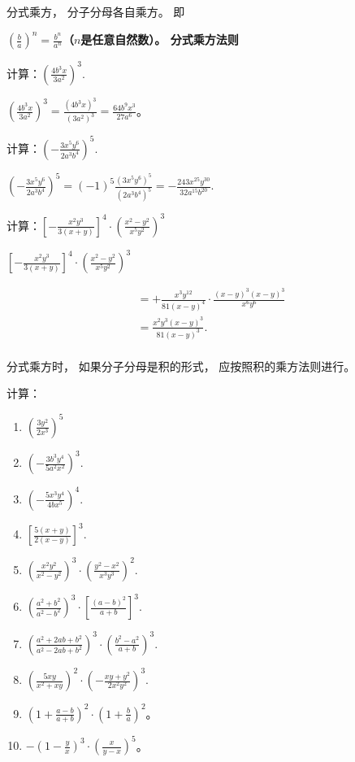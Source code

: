 分式乘方， 分子分母各自乘方。 即

\textbf{\(\left(\frac{b}{a}\right)^n = \frac{b^n}{a^n}\)（\(n\)是任意自然数）。
分式乘方法则}

 计算：\(\left(\frac{4b^3x}{3a^2}\right)^3.\)

\(\left(\frac{4b^3x}{3a^2}\right)^3 = \frac{(4b^3x)^3}{(3a^2)^3} = \frac{64b^9x^3}{27a^6}\)。

 计算：\(\left(-\frac{3x^5y^6}{2a^3b^4}\right)^5.\)

\(\left(-\frac{3x^5y^6}{2a^3b^4}\right)^5 = (-1)^5\frac{(3x^5y^6)^5}{(2a^3b^4)^5} = -\frac{243x^{25}y^{30}}{32a^{15}b^{20}}.\)

计算：\(\left[-\frac{x^{2}y^{3}}{3(x+y)}\right]^{4}\cdot\left(\frac{x^{2}-y^{2}}{x^{5}y^{2}}\right)^{3}\)

\(\left[-\frac{x^2y^3}{3(x + y)}\right]^4\cdot \left(\frac{x^2 - y^2}{x^5y^2}\right)^3\)

\[
\begin{array}{l} = + \frac{x ^{3} y ^{12}}{81 (x - y) ^{4}} \cdot \frac{(x - y) ^{3} (x - y) ^{3}}{x ^{6} y ^{6}} \\ = \frac{x ^{2} y ^{3} (x - y) ^{3}}{81 (x - y) ^{3}}. \\ \end{array}
\]

 分式乘方时， 如果分子分母是积的形式，
应按照积的乘方法则进行。

计算：

\begin{enumerate}[start=1]
\item
  \(\left(\frac{3y^2}{2x^3}\right)^5\)
\item
  \(\left(-\frac{3b^3y^4}{5a^2x^2}\right)^3.\)
\item
  \(\left(-\frac{5x^3y^4}{4bx^5}\right)^4.\)
\item
  \(\left[\frac{5(x + y)}{2(x - y)}\right]^3.\)
\item
  \(\left(\frac{x^2y^2}{x^2 - y^2}\right)^3 \cdot \left(\frac{y^2 - x^2}{x^3y^3}\right)^2.\)
\item
  \(\left(\frac{a^2 + b^2}{a^2 - b^2}\right)^3 \cdot \left[\frac{(a - b)^2}{a + b}\right]^3.\)
\item
  \(\left(\frac{a^2 + 2ab + b^2}{a^2 - 2ab + b^2}\right)^3 \cdot \left(\frac{b^2 - a^2}{a + b}\right)^3.\)
\item
  \(\left(\frac{5xy}{x^2 + xy}\right)^2 \cdot \left(-\frac{xy + y^2}{2x^2y^2}\right)^3.\)
\item
  \(\left(1 + \frac{a - b}{a + b}\right)^2 \cdot \left(1 + \frac{b}{a}\right)^2\)。
\item
  \(-\left(1 - \frac{y}{x}\right)^3 \cdot \left(\frac{x}{y - x}\right)^5\)。
\end{enumerate}

